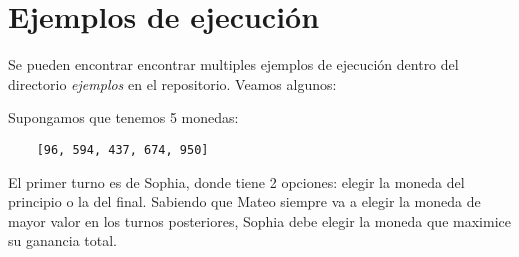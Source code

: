 \section{Ejemplos de ejecución}
Se pueden encontrar encontrar multiples ejemplos de ejecución dentro del directorio \textit{ejemplos} en el repositorio. Veamos algunos:

Supongamos que tenemos 5 monedas:

\begin{lstlisting}
    [96, 594, 437, 674, 950]
\end{lstlisting}

El primer turno es de Sophia, donde tiene 2 opciones: elegir la moneda del principio o la del final.
Sabiendo que Mateo siempre va a elegir la moneda de mayor valor en los turnos posteriores, Sophia debe elegir la moneda que maximice su ganancia total.

